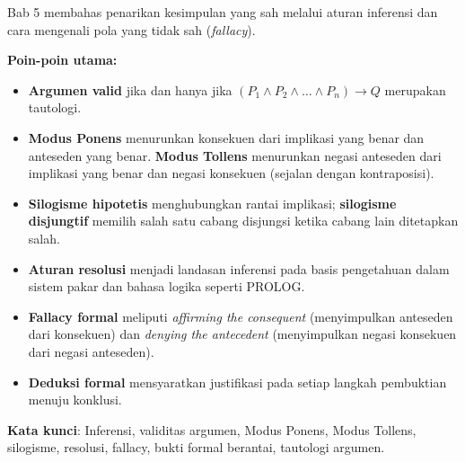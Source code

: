 \documentclass[../main]{subfiles}
\begin{document}

\begin{rangkuman}
Bab 5 membahas penarikan kesimpulan yang sah melalui aturan inferensi dan cara mengenali pola yang tidak sah (\textit{fallacy}).

\textbf{Poin-poin utama:}
\begin{itemize}
  \item \textbf{Argumen valid} jika dan hanya jika $(P_1 \land P_2 \land \ldots \land P_n) \rightarrow Q$ merupakan tautologi.
  \item \textbf{Modus Ponens} menurunkan konsekuen dari implikasi yang benar dan anteseden yang benar. \textbf{Modus Tollens} menurunkan negasi anteseden dari implikasi yang benar dan negasi konsekuen (sejalan dengan kontraposisi).
  \item \textbf{Silogisme hipotetis} menghubungkan rantai implikasi; \textbf{silogisme disjungtif} memilih salah satu cabang disjungsi ketika cabang lain ditetapkan salah.
  \item \textbf{Aturan resolusi} menjadi landasan inferensi pada basis pengetahuan dalam sistem pakar dan bahasa logika seperti PROLOG.
  \item \textbf{Fallacy formal} meliputi \textit{affirming the consequent} (menyimpulkan anteseden dari konsekuen) dan \textit{denying the antecedent} (menyimpulkan negasi konsekuen dari negasi anteseden).
  \item \textbf{Deduksi formal} mensyaratkan justifikasi pada setiap langkah pembuktian menuju konklusi.
\end{itemize}

\textbf{Kata kunci}: Inferensi, validitas argumen, Modus Ponens, Modus Tollens, silogisme, resolusi, fallacy, bukti formal berantai, tautologi argumen.
\end{rangkuman}

\ifSubfilesClassLoaded{
  \renewcommand{\bibname}{Daftar Pustaka}
  
  
}{}
\end{document}
